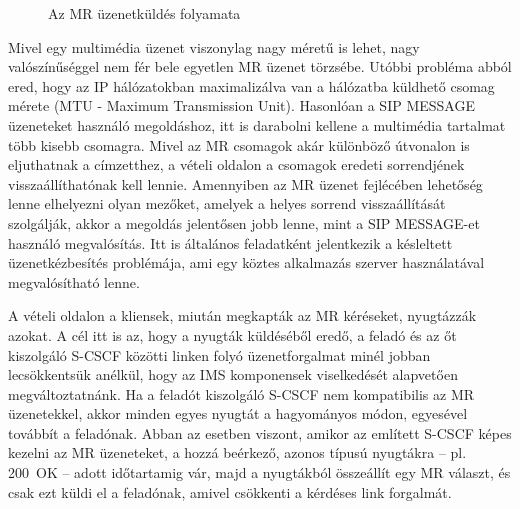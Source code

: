 \begin{figure}[htbp]
\center
{}
\caption{Az MR üzenetküldés folyamata}
\label{fig:mrflow}
\end{figure}

Mivel egy multimédia üzenet viszonylag nagy méretű is lehet, nagy valószínűséggel nem fér bele egyetlen MR üzenet törzsébe. Utóbbi probléma abból ered, hogy az IP hálózatokban maximalizálva van a hálózatba küldhető csomag mérete (MTU - Maximum Transmission Unit). Hasonlóan a SIP MESSAGE üzeneteket használó megoldáshoz, itt is darabolni kellene a multimédia tartalmat több kisebb csomagra. Mivel az MR csomagok akár különböző útvonalon is eljuthatnak a címzetthez, a vételi oldalon a csomagok eredeti sorrendjének visszaállíthatónak kell lennie. Amennyiben az MR üzenet fejlécében lehetőség lenne elhelyezni olyan mezőket, amelyek a helyes sorrend visszaállítását szolgálják, akkor a megoldás jelentősen jobb lenne, mint a SIP MESSAGE-et használó megvalósítás. Itt is általános feladatként jelentkezik a késleltett üzenetkézbesítés problémája, ami egy köztes alkalmazás szerver használatával megvalósítható lenne.

A vételi oldalon a kliensek, miután megkapták az MR kéréseket, nyugtázzák azokat. A cél itt is az, hogy a nyugták küldéséből eredő, a feladó és az őt kiszolgáló S-CSCF közötti linken folyó üzenetforgalmat minél jobban lecsökkentsük anélkül, hogy az IMS komponensek viselkedését alapvetően megváltoztatnánk. Ha a feladót kiszolgáló S-CSCF nem kompatibilis az MR üzenetekkel, akkor minden egyes nyugtát a hagyományos módon, egyesével továbbít a feladónak. Abban az esetben viszont, amikor az említett S-CSCF képes kezelni az MR üzeneteket, a hozzá beérkező, azonos típusú nyugtákra -- pl. 200~OK -- adott időtartamig vár, majd a nyugtákból összeállít egy MR választ, és csak ezt küldi el a feladónak, amivel csökkenti a kérdéses link forgalmát.

